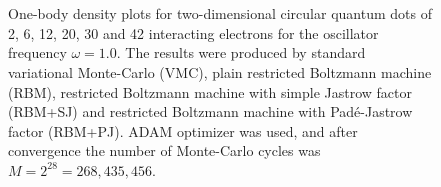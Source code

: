 \begin{figure}[H]
	\centering
	\\
	
	\\
	
	
	\caption{One-body density plots for two-dimensional circular quantum dots of 2, 6, 12, 20, 30 and 42 interacting electrons for the oscillator frequency $\omega=1.0$. The results were produced by standard variational Monte-Carlo (VMC), plain restricted Boltzmann machine (RBM), restricted Boltzmann machine with simple Jastrow factor (RBM+SJ) and restricted Boltzmann machine with Padé-Jastrow factor (RBM+PJ). ADAM optimizer was used, and after convergence the number of Monte-Carlo cycles was $M=2^{28}=268,435,456$.}
	\label{fig:OB_interaction_2D_1p0w}
\end{figure}

